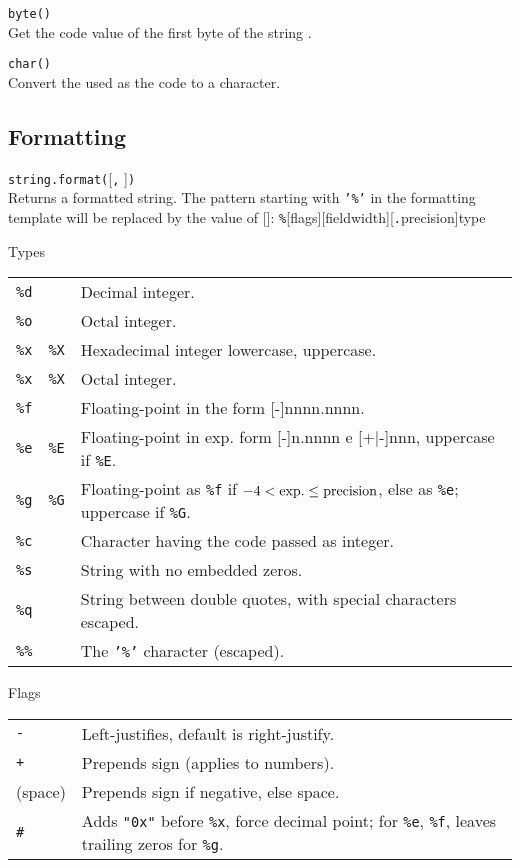 \hangpar \texttt{byte(}\texttt{)}\\
Get the code value of the first byte of the string .

\hangpar \texttt{char(}\texttt{)}\\
Convert the  used as the code to a character.

\subsection*{Formatting}

\hangpar \texttt{string.format(}[\texttt{,} ]\texttt{)}\\
Returns a formatted string. The pattern starting with \texttt{'\%'} in the formatting template  will be replaced by the value of []: \texttt{\%}[\textsf{flags}][\textsf{fieldwidth}][\texttt{.}\textsf{precision}]\textsf{type}

\hangpar \textsf{Types}\\
\begin{tabular}{@{}llp{}}
    \texttt{\%d} & & Decimal integer. \\
    \texttt{\%o} & & Octal integer. \\
    \texttt{\%x} & \texttt{\%X} & Hexadecimal integer lowercase, uppercase. \\
    \texttt{\%x} & \texttt{\%X} & Octal integer. \\
    \texttt{\%f} & & Floating-point in the form [-]nnnn.nnnn. \\
    \texttt{\%e} & \texttt{\%E} & Floating-point in exp. form [-]n.nnnn e [+|-]nnn,
    uppercase if \texttt{\%E}. \\
    \texttt{\%g} & \texttt{\%G} & Floating-point as \texttt{\%f} if $-4<\rm{exp.}\leq precision$, else as \texttt{\%e}; uppercase if \texttt{\%G}. \\
    \texttt{\%c} & & Character having the code passed as integer. \\
    \texttt{\%s} & & String with no embedded zeros. \\
    \texttt{\%q} & & String between double quotes, with special characters escaped. \\
    \texttt{\%\%} & & The \texttt{'\%'} character (escaped). \\
\end{tabular}

\hangpar \textsf{Flags}\\
\begin{tabular}{@{}lp{}}
\texttt{-} & Left-justifies, default is right-justify. \\
\texttt{+} & Prepends sign (applies to numbers). \\
(space) & Prepends sign if negative, else space. \\
\texttt{\#} & Adds \texttt{"0x"} before \texttt{\%x}, force decimal point; for \texttt{\%e}, \texttt{\%f}, leaves trailing zeros for \texttt{\%g}. \\
\end{tabular}


